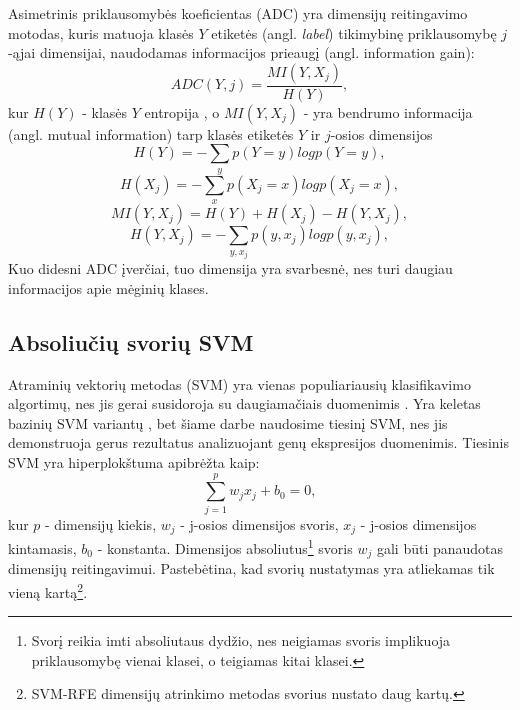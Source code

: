 Asimetrinis priklausomybės koeficientas (ADC) yra dimensijų reitingavimo motodas, kuris matuoja klasės $Y$ etiketės (angl. \textit{label}) tikimybinę priklausomybę $j$-ąjai dimensijai, naudodamas informacijos prieaugį \cite{kent1983information} (angl. information gain):
\begin{equation}
 ADC(Y, j) = \frac{MI(Y, X_j)}{H(Y)},
\end{equation}
kur $H(Y)$ - klasės $Y$ entropija \cite{Shannon:2001:MTC:584091.584093}, o $MI(Y, X_j)$ - yra bendrumo informacija \cite{Shannon:2001:MTC:584091.584093} (angl. mutual information) tarp klasės etiketės $Y$ ir $j$-osios dimensijos
\begin{equation}
 H(Y)=-\sum_y{p(Y=y)log{p(Y=y)}}, 
\end{equation}
\begin{equation}
 H(X_j)=-\sum_x{p(X_j=x) log{p(X_j=x)}},
\end{equation}
\begin{equation}
 MI(Y, X_j) = H(Y) + H(X_j) - H(Y, X_j),
\end{equation}
\begin{equation}
 H(Y, X_j) = -\sum_{y,x_j}{p(y, x_j)log{p(y, x_j)}},
\end{equation}
Kuo didesni ADC įverčiai, tuo dimensija yra svarbesnė, nes turi daugiau informacijos apie mėginių klases.

\subsection{Absoliučių svorių SVM}

Atraminių vektorių metodas (SVM) yra vienas populiariausių klasifikavimo algortimų, nes jis gerai susidoroja su daugiamačiais duomenimis \cite{guyon2002gene}. Yra keletas bazinių SVM variantų \cite{vapnik2000nature}, bet šiame darbe naudosime tiesinį SVM, nes jis demonstruoja gerus rezultatus analizuojant genų ekspresijos duomenimis. Tiesinis SVM yra hiperplokštuma apibrėžta kaip:
\begin{equation}
 \sum_{j=1}^{p}{w_jx_j + b_0 = 0},
\end{equation}
kur $p$ - dimensijų kiekis, $w_j$ - j-osios dimensijos svoris, $x_j$ - j-osios
dimensijos kintamasis, $b_0$ - konstanta. Dimensijos absoliutus\footnote{Svorį
reikia imti absoliutaus dydžio, nes neigiamas svoris implikuoja priklausomybę 
vienai klasei, o teigiamas kitai klasei.} svoris $w_j$ gali būti panaudotas
dimensijų reitingavimui. Pastebėtina, kad svorių nustatymas yra atliekamas tik 
vieną kartą\footnote{SVM-RFE dimensijų atrinkimo metodas svorius nustato daug kartų.}.

